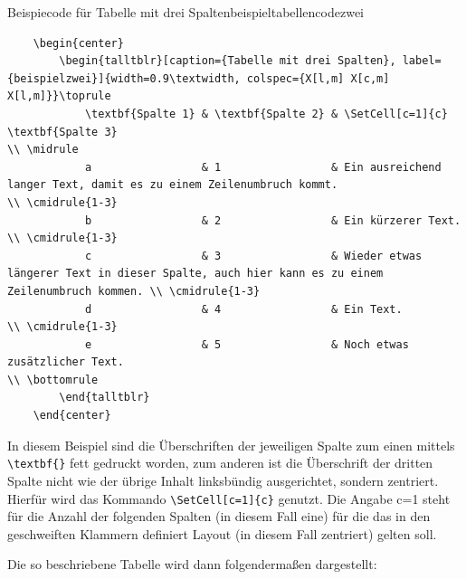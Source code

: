 \begin{code}{Beispiecode für Tabelle mit drei Spalten}{beispieltabellencodezwei}
	\begin{verbatim}
	\begin{center}
		\begin{talltblr}[caption={Tabelle mit drei Spalten}, label={beispielzwei}]{width=0.9\textwidth, colspec={X[l,m] X[c,m] X[l,m]}}\toprule
			\textbf{Spalte 1} & \textbf{Spalte 2} & \SetCell[c=1]{c} \textbf{Spalte 3}                                                            \\ \midrule
			a                 & 1                 & Ein ausreichend langer Text, damit es zu einem Zeilenumbruch kommt.                           \\ \cmidrule{1-3}
			b                 & 2                 & Ein kürzerer Text.                                                                            \\ \cmidrule{1-3}
			c                 & 3                 & Wieder etwas längerer Text in dieser Spalte, auch hier kann es zu einem Zeilenumbruch kommen. \\ \cmidrule{1-3}
			d                 & 4                 & Ein Text.                                                                                     \\ \cmidrule{1-3}
			e                 & 5                 & Noch etwas zusätzlicher Text.                                                                 \\ \bottomrule
		\end{talltblr}
	\end{center}	
	\end{verbatim}
\end{code}

In diesem Beispiel sind die Überschriften der jeweiligen Spalte zum einen
mittels \texttt{\textbackslash textbf\{\}} fett gedruckt worden, zum anderen
ist die Überschrift der dritten Spalte nicht wie der übrige Inhalt linksbündig
ausgerichtet, sondern zentriert. Hierfür wird das Kommando
\texttt{\textbackslash SetCell[c=1]\{c\}} genutzt. Die Angabe c=1 steht für die
Anzahl der folgenden Spalten (in diesem Fall eine) für die das in den
geschweiften Klammern definiert Layout (in diesem Fall zentriert) gelten soll.

Die so beschriebene Tabelle wird dann folgendermaßen dargestellt:

